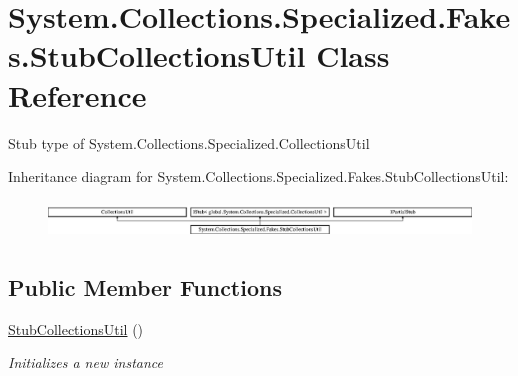\hypertarget{class_system_1_1_collections_1_1_specialized_1_1_fakes_1_1_stub_collections_util}{\section{System.\-Collections.\-Specialized.\-Fakes.\-Stub\-Collections\-Util Class Reference}
\label{class_system_1_1_collections_1_1_specialized_1_1_fakes_1_1_stub_collections_util}
}


Stub type of System.\-Collections.\-Specialized.\-Collections\-Util 


Inheritance diagram for System.\-Collections.\-Specialized.\-Fakes.\-Stub\-Collections\-Util\-:\begin{figure}[H]
\begin{center}
\leavevmode
\includegraphics[height=1.014493cm]{class_system_1_1_collections_1_1_specialized_1_1_fakes_1_1_stub_collections_util}
\end{center}
\end{figure}
\subsection*{Public Member Functions}
\begin{DoxyCompactItemize}
\item 
\hyperlink{class_system_1_1_collections_1_1_specialized_1_1_fakes_1_1_stub_collections_util_ac1eaf624e0c2c42eb5636dca41704f91}{Stub\-Collections\-Util} ()
\begin{DoxyCompactList}\small\item\em Initializes a new instance\end{DoxyCompactList}\end{DoxyCompactItemize}

